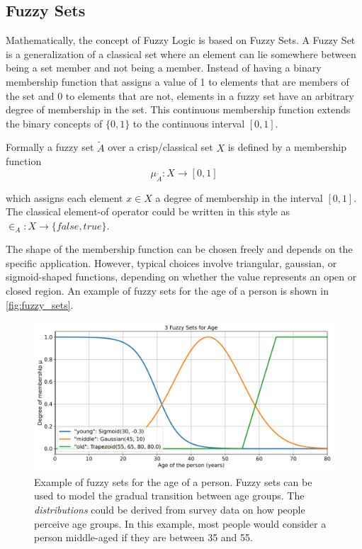 \subsection{Fuzzy Sets}

Mathematically, the concept of Fuzzy Logic is based on Fuzzy Sets. A Fuzzy Set is a generalization of a classical set where an element can lie somewhere between being a set member and not being a member. Instead of having a binary membership function that assigns a value of 1 to elements that are members of the set and 0 to elements that are not, elements in a fuzzy set have an arbitrary degree of membership in the set. This continuous membership function extends the binary concepts of $\{0, 1\}$ to the continuous interval $[0, 1]$.

Formally a fuzzy set $\tilde{A}$ over a crisp/classical set $X$ is defined by a membership function
\begin{equation}
      \mu_{\tilde{A}}: X \rightarrow [0, 1]
\end{equation}

which assigns each element $x \in X$ a degree of membership in the interval $[0, 1]$. The classical element-of operator could be written in this style as $\in_A: X \rightarrow \{false, true\}$.

The shape of the membership function can be chosen freely and depends on the specific application. However, typical choices involve triangular, gaussian, or sigmoid-shaped functions, depending on whether the value represents an open or closed region. An example of fuzzy sets for the age of a person is shown in \autoref{fig:fuzzy_sets}.


\begin{figure}[H]
      \centering
      \includegraphics[width=0.8\columnwidth,trim={0 0 0 1cm},clip]{figures/Intro/age-fuzzy-sets.png}
      \caption[Example of fuzzy sets for the age of a person.]      {Example of fuzzy sets for the age of a person. Fuzzy sets can be used to model the gradual transition between age groups. The \emph{distributions} could be derived from survey data on how people perceive age groups. In this example, most people would consider a person middle-aged if they are between 35 and 55.}
      \label{fig:fuzzy_sets}
\end{figure}


